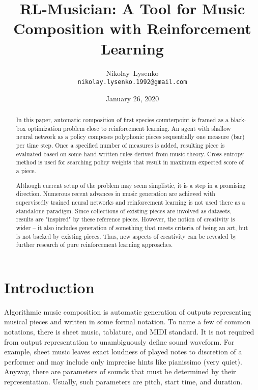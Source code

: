 \documentclass{article}
\title{RL-Musician: A Tool for Music Composition with Reinforcement Learning}
\date{January 26, 2020}
\author{
  Nikolay~Lysenko\\
  \texttt{nikolay.lysenko.1992@gmail.com} \\
}
\begin{document}
\maketitle

\begin{abstract}
In this paper, automatic composition of first species counterpoint is framed as a black-box optimization problem close to reinforcement learning. An agent with shallow neural network as a policy composes polyphonic pieces sequentially one measure (bar) per time step. Once a specified number of measures is added, resulting piece is evaluated based on some hand-written rules derived from music theory. Cross-entropy method is used for searching policy weights that result in maximum expected score of a piece.

Although current setup of the problem may seem simplistic, it is a step in a promising direction. Numerous recent advances in music generation are achieved with supervisedly trained neural networks and reinforcement learning is not used there as a standalone paradigm. Since collections of existing pieces are involved as datasets, results are "inspired" by these reference pieces. However, the notion of creativity is wider -- it also includes generation of something that meets criteria of being an art, but is not backed by existing pieces. Thus, new aspects of creativity can be revealed by further research of pure reinforcement learning approaches.
\end{abstract}



\section{Introduction}
\label{sec:introduction}

Algorithmic music composition is automatic generation of outputs representing musical pieces and written in some formal notation. To name a few of common notations, there is sheet music, tablature, and MIDI standard. It is not required from output representation to unambiguously define sound waveform. For example, sheet music leaves exact loudness of played notes to discretion of a performer and may include only imprecise hints like pianissimo (very quiet). Anyway, there are parameters of sounds that must be determined by their representation. Usually, such parameters are pitch, start time, and duration.
\end{document}

